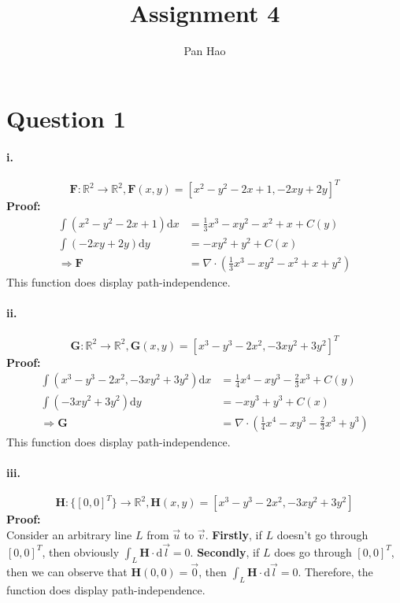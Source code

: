 \documentclass[11pt, a4paper]{article}
\begin{document}
\title{Assignment 4}
\author{Pan Hao}
\date{}
\maketitle

\section*{Question 1}
\paragraph{i.}
$$\bm{F}: \mathbb{R}^2 \to \mathbb{R}^2, \bm{F}(x, y) = [x^2 - y ^2 - 2x + 1, -2xy + 2y]^T$$
\textbf{Proof:}
$$\begin{aligned}
    \int (x^2-y^2-2x+1) \mathrm{d}x &= \frac{1}{3}x^3-xy^2-x^2+x+C(y) \\
    \int (-2xy + 2y) \mathrm{d}y &= -xy^2 + y^2 + C(x) \\
    \Rightarrow \bm{F} &= \nabla \cdot (\frac{1}{3}x^3 - xy^2 -x^2 + x + y^2)
\end{aligned}$$
This function does display
path-independence.

\paragraph{ii.}
$$\bm{G}: \mathbb{R}^2 \to \mathbb{R}^2, \bm{G}(x, y) = [x^3-y^3-2x^2, -3xy^2+3y^2]^T$$
\textbf{Proof:}
$$\begin{aligned}
    \int (x^3-y^3-2x^2, -3xy^2+3y^2)\mathrm{d}x &= \frac{1}{4}x^4-xy^3 -\frac{2}{3}x^3 +C(y) \\
    \int (-3xy^2+3y^2) \mathrm{d}y &= -xy^3 + y^3 + C(x) \\
    \Rightarrow \bm{G} &= \nabla \cdot (\frac{1}{4}x^4-xy^3-\frac{2}{3}x^3+y^3)
\end{aligned}$$
This function does display
path-independence.

\paragraph{iii.}
$$\bm{H}: \{[0, 0]^T\} \to \mathbb{R}^2, \bm{H}(x, y) = [x^3-y^3-2x^2, -3xy^2+3y^2]$$
\textbf{Proof:} \\
Consider an arbitrary line $L$ from $\vec{u}$ to $\vec{v}$. \textbf{Firstly}, if $L$ doesn't go through $[0, 0]^T$, then obviously $\int_L \bm{H} \cdot \mathrm{d}\vec{l} = 0$. \textbf{Secondly}, if $L$ does go through $[0, 0]^T$, then we can observe that $\bm{H}(0, 0) = \vec{0}$, then $\int_L \bm{H} \cdot \mathrm{d}\vec{l} = 0$. Therefore, the function does display path-independence.
\end{document}
